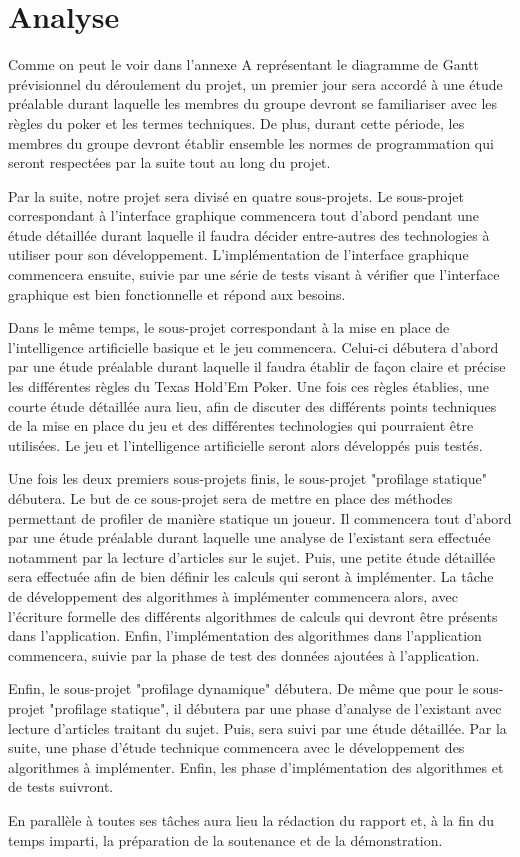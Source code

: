 \documentclass{report}
\begin{document}
\section{Analyse}
\hspace{0.5cm}Comme on peut le voir dans l'annexe A représentant le diagramme de Gantt prévisionnel du déroulement du projet, un premier jour sera accordé à une étude préalable durant laquelle les membres du groupe devront se familiariser avec les règles du poker et les termes techniques. De plus, durant cette période, les membres du groupe devront établir ensemble les normes de programmation qui seront respectées par la suite tout au long du projet.\par
Par la suite, notre projet sera divisé en quatre sous-projets. 
Le sous-projet correspondant à l'interface graphique commencera tout d'abord pendant une étude détaillée durant laquelle il faudra décider entre-autres des technologies à utiliser pour son développement. L'implémentation de l'interface graphique commencera ensuite, suivie par une série de tests visant à vérifier que l'interface graphique est bien fonctionnelle et répond aux besoins. \par
Dans le même temps, le sous-projet correspondant à la mise en place de l'intelligence artificielle basique et le jeu commencera. Celui-ci débutera d'abord par une étude préalable durant laquelle il faudra établir de façon claire et précise les différentes règles du Texas Hold'Em Poker. Une fois ces règles établies, une courte étude détaillée aura lieu, afin de discuter des différents points techniques de la mise en place du jeu et des différentes technologies qui pourraient être utilisées. Le jeu et l'intelligence artificielle seront alors développés puis testés.\par
Une fois les deux premiers sous-projets finis, le sous-projet "profilage statique" débutera. Le but de ce sous-projet sera de mettre en place des méthodes permettant de profiler de manière statique un joueur. Il commencera tout d'abord par une étude préalable durant laquelle une analyse de l'existant sera effectuée notamment par la lecture d'articles sur le sujet. Puis, une petite étude détaillée sera effectuée afin de bien définir les calculs qui seront à implémenter. La tâche de développement des algorithmes à implémenter commencera alors, avec l'écriture formelle des différents algorithmes de calculs qui devront être présents dans l'application. Enfin, l'implémentation des algorithmes dans l'application commencera, suivie par la phase de test des données ajoutées à l'application. \par
Enfin, le sous-projet "profilage dynamique" débutera. De même que pour le sous-projet "profilage statique", il débutera par une phase d'analyse de l'existant avec lecture d'articles traitant du sujet. Puis, sera suivi par une étude détaillée. Par la suite, une phase d'étude technique commencera avec le développement des algorithmes à implémenter. Enfin, les phase d'implémentation des algorithmes et de tests suivront.\par
En parallèle à toutes ses tâches aura lieu la rédaction du rapport et, à la fin du temps imparti, la préparation de la soutenance et de la démonstration. \par
\newpage
\end{document}
